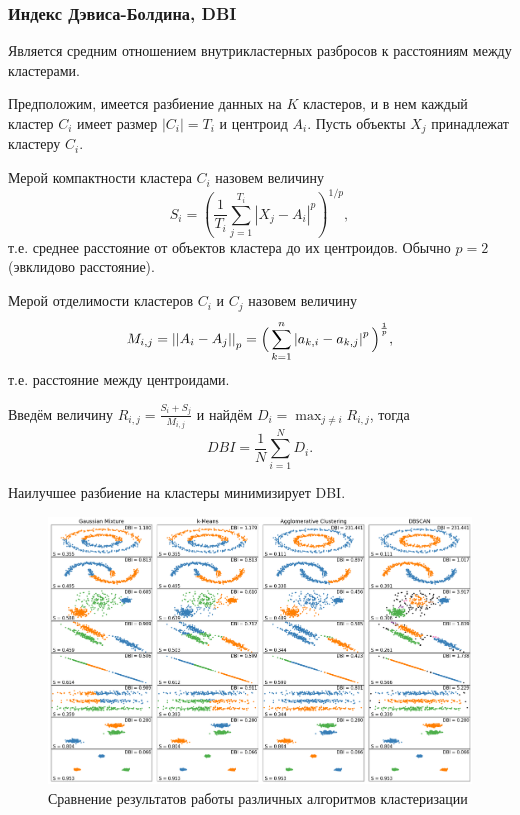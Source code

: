 \documentclass[10pt]{article}
\begin{document}
\subsubsection{Индекс Дэвиса-Болдина, DBI}

Является средним отношением внутрикластерных разбросов к расстояниям между кластерами. 

Предположим, имеется разбиение данных на $K$ кластеров, и в нем каждый кластер $C_i$ имеет размер $|C_i| = T_i$ и центроид $A_i$. Пусть объекты $X_j$ принадлежат кластеру $C_i$. 

Мерой компактности кластера $C_i$ назовем величину $$S_ {i} = \left({\dfrac{1}{T_{i}}}\sum_{j=1}^{T_{i}}{\left|X_{j}-A_{i}\right|^{p}}\right)^{1/p},$$ т.е. среднее расстояние от объектов кластера до их центроидов. Обычно $p = 2$ (эвклидово расстояние).

Мерой отделимости кластеров $C_i$ и $C_j$ назовем величину
$$M _ {{i, j}} = \left | \left | A_ {i} -A_ {j} \right | \right |_ {p} = { \Bigl (} \sum_{{k = 1 }} ^ {{n}} \left | a_{{k, i}} - a_{{k, j}} \right | ^ {p} { \Bigr)} ^ {{{ \frac 1p}}},$$ т.е. расстояние между центроидами.

Введём величину $R_{{i, j}} = \frac{S_{i} + S_{j}}{M_{{i, j}}}$ и найдём $D_{i} = \max_{j \neq i} R_{i, j}$, тогда $$DBI = \frac{1}{N} \sum_{i=1}^{N}D_{i}.$$

Наилучшее разбиение на кластеры минимизирует DBI.

\begin{figure}[H]
	\begin{center}
		\includegraphics[scale = 0.3]{qual.png}
		\caption{Сравнение результатов работы различных алгоритмов кластеризации}
	\end{center}
\end{figure}
\end{document}
